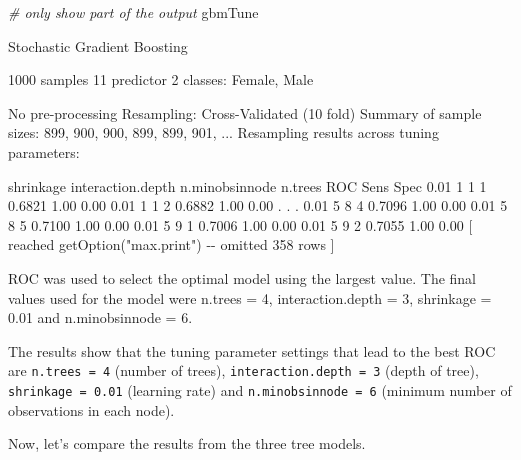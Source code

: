 \documentclass[
  12pt,
]{krantz}
\makeatletter
\newenvironment{Shaded}{\begin{snugshade}}{\end{snugshade}}
\newcommand{\CommentTok}[1]{\textcolor[rgb]{0.37,0.37,0.37}{\textit{#1}}}
\newcommand{\NormalTok}[1]{#1}
\newenvironment{kframe}{%
\medskip{}
\setlength{\fboxsep}{.8em}
 \def\at@end@of@kframe{}%
 \ifinner\ifhmode%
  \def\at@end@of@kframe{\end{minipage}}%
  \begin{minipage}{\columnwidth}%
 \fi\fi%
 \def\FrameCommand##1{\hskip\@totalleftmargin \hskip-\fboxsep
 \colorbox{shadecolor}{##1}\hskip-\fboxsep
     \hskip-\linewidth \hskip-\@totalleftmargin \hskip\columnwidth}%
 \MakeFramed {\advance\hsize-\width
   \@totalleftmargin\z@ \linewidth\hsize
   \@setminipage}}%
 {\par\unskip\endMakeFramed%
 \at@end@of@kframe}
\renewenvironment{Shaded}{\begin{kframe}}{\end{kframe}}
\makeatother
\begin{document}
\begin{Shaded}
\begin{Highlighting}[]
\CommentTok{\# only show part of the output}
\NormalTok{gbmTune}
\end{Highlighting}
\end{Shaded}

\begin{Shaded}
\begin{Highlighting}[]
\NormalTok{Stochastic Gradient Boosting }

\NormalTok{1000 samples}
\NormalTok{  11 predictor}
\NormalTok{   2 classes: \textquotesingle{}Female\textquotesingle{}, \textquotesingle{}Male\textquotesingle{} }

\NormalTok{No pre{-}processing}
\NormalTok{Resampling: Cross{-}Validated (10 fold) }
\NormalTok{Summary of sample sizes: 899, 900, 900, 899, 899, 901, ... }
\NormalTok{Resampling results across tuning parameters:}

\NormalTok{shrinkage interaction.depth n.minobsinnode n.trees ROC    Sens Spec    }
\NormalTok{0.01      1                 1              1       0.6821 1.00 0.00}
\NormalTok{0.01      1                 1              2       0.6882 1.00 0.00}
\NormalTok{  .}
\NormalTok{  .}
\NormalTok{  .}
\NormalTok{0.01      5                 8              4       0.7096 1.00 0.00}
\NormalTok{0.01      5                 8              5       0.7100 1.00 0.00}
\NormalTok{0.01      5                 9              1       0.7006 1.00 0.00}
\NormalTok{0.01      5                 9              2       0.7055 1.00 0.00}
\NormalTok{ [ reached getOption("max.print") {-}{-} omitted 358 rows ]}

\NormalTok{ROC was used to select the optimal model using the largest value.}
\NormalTok{The final values used for the model were n.trees = 4, }
\NormalTok{interaction.depth = 3, shrinkage = 0.01 and n.minobsinnode = 6.}
\end{Highlighting}
\end{Shaded}

The results show that the tuning parameter settings that lead to the best ROC are \texttt{n.trees\ =\ 4} (number of trees), \texttt{interaction.depth\ =\ 3} (depth of tree), \texttt{shrinkage\ =\ 0.01} (learning rate) and \texttt{n.minobsinnode\ =\ 6} (minimum number of observations in each node).

Now, let's compare the results from the three tree models.
\end{document}
